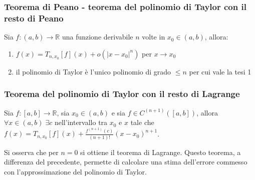 \documentclass[a4paper]{article}
\newcommand\cont[2]{C^{(#1)} \left({#2}\right)}
\begin{document}
\subsubsection*{Teorema di Peano - teorema del polinomio di Taylor con il resto di Peano}
Sia \(f:\left(a, b\right) \to \mathbb{R}\) una funzione derivabile \(n\) volte in \(x_0 \in \left(a, b\right)\), allora:
\begin{enumerate}
	\item \(f(x) = T_{n,x_0}[f](x) + o(\left|x - x_0\right|^n)\) per \(x \to x_0\)
	\item il polinomio di Taylor è l'unico polinomio di grado \(\leq n\) per cui vale la tesi 1
\end{enumerate}

\subsubsection*{Teorema del polinomio di Taylor con il resto di Lagrange}
Sia \(f: \left[a, b\right] \to \mathbb{R}\), sia \(x_0 \in \left(a, b\right)\) e sia \(f \in \cont{n+1}{\left[a, b\right]}\),
allora \(\forall x \in \left(a, b\right) \; \exists c\) nell'intervallo tra \(x_0\) e \(x\) tale che
\(\displaystyle f(x) = T_{n,x_0}[f](x) + \frac{f^{(n+1)}(c)}{(n+1)!} (x-x_0)^{n+1}\).

Si osserva che per \(n = 0\) si ottiene il teorema di Lagrange. Questo teorema, a differenza del precedente, permette di calcolare una stima dell'errore commesso
con l'approssimazione del polinomio di Taylor.
\end{document}
